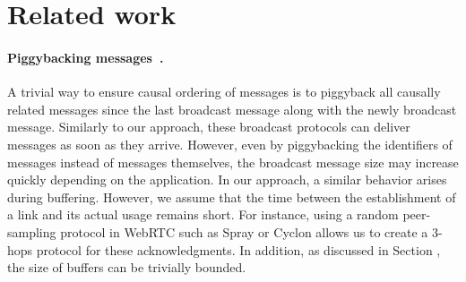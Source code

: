 
\section{Related work}
\label{sec:relatedwork}


\paragraph{Piggybacking messages~\cite{birman1987reliable,hadzilacos1993fault}.}
A trivial way to ensure causal ordering of messages is to piggyback all causally
related messages since the last broadcast message along with the newly broadcast
message. Similarly to our approach, these broadcast protocols can deliver
messages as soon as they arrive.  However, even by piggybacking the identifiers
of messages instead of messages themselves, the broadcast message size may
increase quickly depending on the application. In our approach, a similar
behavior arises during buffering. However, we assume that the time between the
establishment of a link and its actual usage remains short. For instance, using
a random peer-sampling protocol in WebRTC such as Spray or Cyclon allows us to
create a 3-hops protocol for these acknowledgments. In addition, as discussed
in Section , the size of buffers can be trivially
bounded. 

